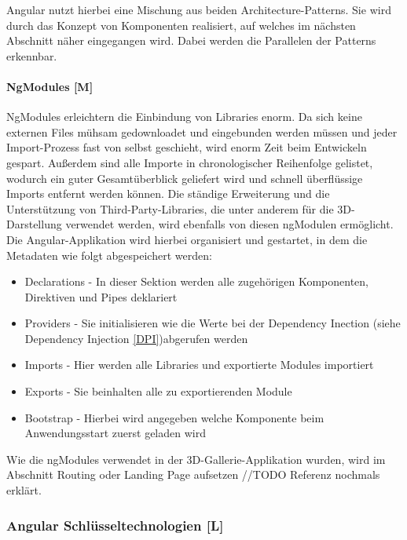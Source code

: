 Angular nutzt hierbei eine Mischung aus beiden Architecture-Patterns. Sie wird durch das Konzept von Komponenten realisiert, auf welches im nächsten Abschnitt näher eingegangen wird. Dabei werden die Parallelen der Patterns erkennbar.
\cite{MVVM}

\paragraph{NgModules [M]}\label{sec:NgModules}
NgModules erleichtern die Einbindung von Libraries enorm. Da sich keine externen Files mühsam gedownloadet und eingebunden werden müssen und jeder Import-Prozess fast von selbst geschieht, wird enorm Zeit beim Entwickeln gespart. Außerdem sind alle Importe in chronologischer Reihenfolge gelistet, wodurch ein guter Gesamtüberblick geliefert wird und schnell überflüssige Imports entfernt werden können. Die ständige Erweiterung und die Unterstützung von Third-Party-Libraries, die unter anderem für die 3D-Darstellung verwendet werden, wird ebenfalls von diesen ngModulen ermöglicht. Die Angular-Applikation wird hierbei organisiert und gestartet, in dem die Metadaten wie folgt abgespeichert werden:

\begin{itemize}
  \item Declarations - In dieser Sektion werden alle zugehörigen Komponenten, Direktiven und Pipes deklariert 
  \item Providers - Sie initialisieren wie die Werte bei der Dependency Inection (siehe Dependency Injection \ref{DPI})abgerufen werden \cite{AngularProviders}
  \item Imports - Hier werden alle Libraries und exportierte Modules importiert
  \item Exports - Sie beinhalten alle zu exportierenden Module
  \item Bootstrap - Hierbei wird angegeben welche Komponente beim Anwendungsstart zuerst geladen wird
\end{itemize}

Wie die ngModules verwendet in der 3D-Gallerie-Applikation wurden, wird im Abschnitt Routing oder Landing Page aufsetzen //TODO Referenz nochmals erklärt.
\cite{AngularNgModules}
\cite{AngularNgModulesAPI}
\cite{AngularBuch}


\subsubsection{Angular Schlüsseltechnologien [L]}
